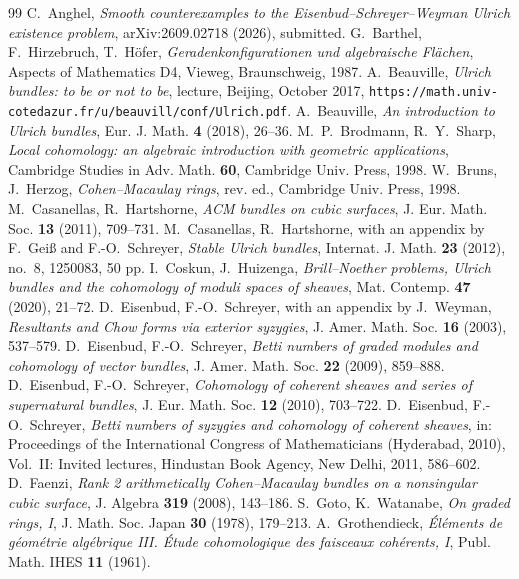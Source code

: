 \begin{thebibliography}{99}
 C.~Anghel, \emph{Smooth counterexamples to the Eisenbud--Schreyer--Weyman Ulrich existence problem}, arXiv:2609.02718 (2026), submitted.
 G.~Barthel, F.~Hirzebruch, T.~H\"ofer, \emph{Geradenkonfigurationen und algebraische Fl\"achen}, Aspects of Mathematics D4, Vieweg, Braunschweig, 1987.
 A.~Beauville, \emph{Ulrich bundles: to be or not to be}, lecture, Beijing, October 2017, \texttt{https://math.univ-cotedazur.fr/u/beauvill/conf/Ulrich.pdf}.
 A.~Beauville, \emph{An introduction to Ulrich bundles}, Eur. J. Math. \textbf{4} (2018), 26--36.
 M.~P.~Brodmann, R.~Y.~Sharp, \emph{Local cohomology: an algebraic introduction with geometric applications}, Cambridge Studies in Adv. Math. \textbf{60}, Cambridge Univ. Press, 1998.
 W.~Bruns, J.~Herzog, \emph{Cohen--Macaulay rings}, rev. ed., Cambridge Univ. Press, 1998.
 M.~Casanellas, R.~Hartshorne, \emph{ACM bundles on cubic surfaces}, J. Eur. Math. Soc. \textbf{13} (2011), 709--731.
 M.~Casanellas, R.~Hartshorne, with an appendix by F.~Gei\ss{} and F.-O.~Schreyer, \emph{Stable Ulrich bundles}, Internat. J. Math. \textbf{23} (2012), no.~8, 1250083, 50 pp.
 I.~Coskun, J.~Huizenga, \emph{Brill--Noether problems, Ulrich bundles and the cohomology of moduli spaces of sheaves}, Mat. Contemp. \textbf{47} (2020), 21--72.
 D.~Eisenbud, F.-O.~Schreyer, with an appendix by J.~Weyman, \emph{Resultants and Chow forms via exterior syzygies}, J. Amer. Math. Soc. \textbf{16} (2003), 537--579.
 D.~Eisenbud, F.-O.~Schreyer, \emph{Betti numbers of graded modules and cohomology of vector bundles}, J. Amer. Math. Soc. \textbf{22} (2009), 859--888.
 D.~Eisenbud, F.-O.~Schreyer, \emph{Cohomology of coherent sheaves and series of supernatural bundles}, J. Eur. Math. Soc. \textbf{12} (2010), 703--722.
 D.~Eisenbud, F.-O.~Schreyer, \emph{Betti numbers of syzygies and cohomology of coherent sheaves}, in: Proceedings of the International Congress of Mathematicians (Hyderabad, 2010), Vol.~II: Invited lectures, Hindustan Book Agency, New Delhi, 2011, 586--602.
 D.~Faenzi, \emph{Rank 2 arithmetically Cohen--Macaulay bundles on a nonsingular cubic surface}, J. Algebra \textbf{319} (2008), 143--186.
 S.~Goto, K.~Watanabe, \emph{On graded rings, I}, J. Math. Soc. Japan \textbf{30} (1978), 179--213.
 A.~Grothendieck, \emph{\'El\'ements de g\'eom\'etrie alg\'ebrique III. \'Etude cohomologique des faisceaux coh\'erents, I}, Publ. Math. IHES \textbf{11} (1961).

\end{thebibliography}
